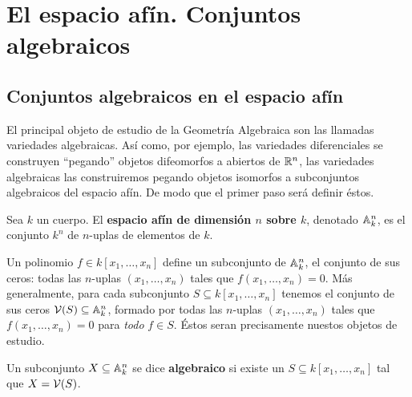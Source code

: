 \documentclass[ACGA.tex]{subfiles}
\begin{document}
\chapter{El espacio afín. Conjuntos algebraicos}

\section{Conjuntos algebraicos en el espacio afín}

 El principal objeto de estudio de la Geometría Algebraica son las llamadas variedades algebraicas. Así como, por ejemplo, las variedades diferenciales se construyen ``pegando'' objetos difeomorfos a abiertos de $\mathbb{R}^n$, las variedades algebraicas las construiremos pegando objetos isomorfos a subconjuntos algebraicos del espacio afín. De modo que el primer paso será definir éstos.

 \begin{defi} Sea $k$ un cuerpo. El {\bf espacio afín de dimensión $n$ sobre $k$}, denotado $\mathbb{A}^n_k$, es el conjunto $k^n$ de $n$-uplas de elementos de $k$.
 \end{defi}

Un polinomio $f\in k[x_1,\ldots,x_n]$ define un subconjunto de $\mathbb{A}^n_k$, el conjunto de sus ceros: todas las $n$-uplas $(x_1,\ldots,x_n)$ tales que $f(x_1,\ldots,x_n)=0$. Más generalmente, para cada subconjunto $S\subseteq k[x_1,\ldots,x_n]$ tenemos el conjunto de sus ceros $\mathcal{V}(S)\subseteq \mathbb{A}^n_k$, formado por todas las $n$-uplas $(x_1,\ldots,x_n)$ tales que $f(x_1,\ldots,x_n)=0$ para \emph{todo} $f\in S$. Éstos seran precisamente nuestos objetos de estudio.

\begin{defi} Un subconjunto $X\subseteq \mathbb{A}^n_k$ se dice {\bf algebraico} si existe un $S\subseteq k[x_1,\ldots,x_n]$ tal que $X=\mathcal{V}(S)$.
 
\end{defi}

\end{document}
